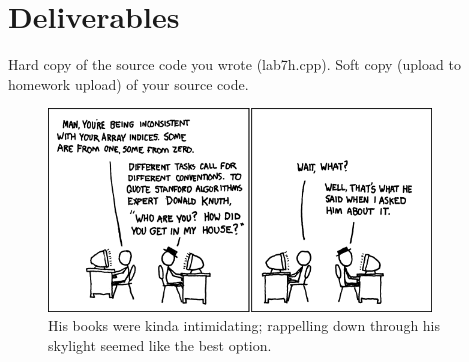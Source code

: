\documentclass[letterpaper,12pt]{article}
\begin{document}
\section*{Deliverables}
Hard copy of the source code you wrote (lab7h.cpp). Soft copy (upload to homework upload) of
your source code.

\begin{figure}[ht!]
	\centering
	\includegraphics[width=4in]{donald_knuth.png}
    \caption*{His books were kinda intimidating; rappelling down through his skylight seemed like the best option.}
\end{figure}
\end{document}

